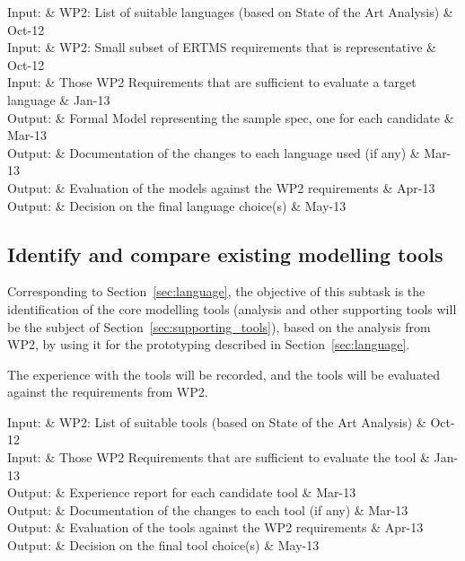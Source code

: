 \documentclass{template/openetcs_article}
\begin{document}

\begin{inoutput}
Input: & WP2: List of suitable languages (based on State of the Art Analysis) & Oct-12 \\
Input: & WP2: Small subset of ERTMS requirements that is representative & Oct-12 \\
Input: & Those WP2 Requirements that are sufficient to evaluate a target language & Jan-13 \\
\hline
Output: & Formal Model representing the sample spec, one for each candidate & Mar-13 \\
Output: & Documentation of the changes to each language used (if any) & Mar-13 \\
Output: & Evaluation of the models against the WP2 requirements & Apr-13 \\
Output: & Decision on the final language choice(s) & May-13 \\
\end{inoutput}



\subsection{Identify and compare existing modelling tools}
\label{sec:tool}

Corresponding to Section~\ref{sec:language}, the objective of this
subtask is the identification of the core modelling tools 
(analysis and other supporting tools will be the subject of 
Section~\ref{sec:supporting_tools}), 
based on the
analysis from WP2, by using it for the prototyping described in
Section~\ref{sec:language}. 

The experience with the tools will be recorded, and the tools will be
evaluated against the requirements from WP2.

\begin{inoutput}
Input: & WP2: List of suitable tools (based on State of the Art Analysis) & Oct-12 \\
Input: & Those WP2 Requirements that are sufficient to evaluate the tool & Jan-13 \\
\hline
Output: & Experience report for each candidate tool & Mar-13 \\
Output: & Documentation of the changes to each tool (if any) & Mar-13 \\
Output: & Evaluation of the tools against the WP2 requirements & Apr-13 \\
Output: & Decision on the final tool choice(s) & May-13 \\
\end{inoutput}
\end{document}
